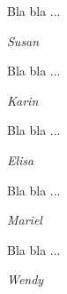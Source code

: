 Bla bla ...\\
\begin{flushright}
\textit{Susan}
\end{flushright}
\vspace{\baselineskip}
Bla bla ...\\
\begin{flushright}
\textit{Karin}
\end{flushright}
\vspace{\baselineskip}
Bla bla ...\\
\begin{flushright}
\textit{Elisa}
\end{flushright}
\vspace{\baselineskip}
Bla bla ...\\
\begin{flushright}
\textit{Mariel}
\end{flushright}
\vspace{\baselineskip}
Bla bla ...\\
\begin{flushright}
\textit{Wendy}
\end{flushright}
\vspace{\baselineskip}
\newpage
